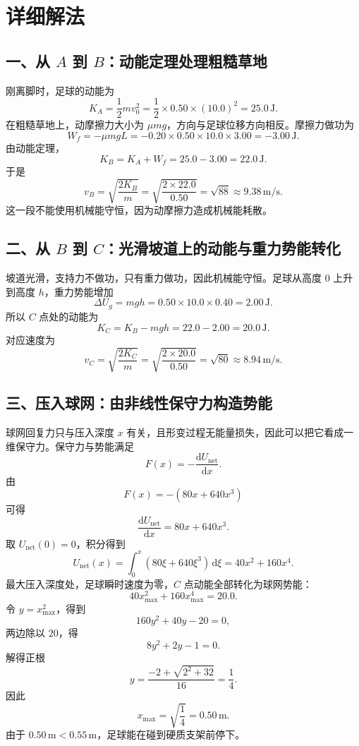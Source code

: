 \documentclass[11pt,a4paper,fontset=fandol]{ctexart}
\newcommand{\dd}{\mathrm{d}}
\begin{document}
\section*{详细解法}

\subsection*{一、从 $A$ 到 $B$：动能定理处理粗糙草地}
刚离脚时，足球的动能为
\[
 K_A=\frac{1}{2}mv_0^2=\frac{1}{2}\times 0.50\times (10.0)^2=25.0\,\mathrm{J}.
\]
在粗糙草地上，动摩擦力大小为 $\mu mg$，方向与足球位移方向相反。摩擦力做功为
\[
 W_f=-\mu mgL=-0.20\times 0.50\times 10.0\times 3.00=-3.00\,\mathrm{J}.
\]
由动能定理，
\[
 K_B=K_A+W_f=25.0-3.00=22.0\,\mathrm{J}.
\]
于是
\[
 v_B=\sqrt{\frac{2K_B}{m}}=\sqrt{\frac{2\times 22.0}{0.50}}
=\sqrt{88}\approx 9.38\,\mathrm{m/s}.
\]
这一段不能使用机械能守恒，因为动摩擦力造成机械能耗散。

\subsection*{二、从 $B$ 到 $C$：光滑坡道上的动能与重力势能转化}
坡道光滑，支持力不做功，只有重力做功，因此机械能守恒。足球从高度 $0$ 上升到高度 $h$，重力势能增加
\[
 \Delta U_g=mgh=0.50\times 10.0\times 0.40=2.00\,\mathrm{J}.
\]
所以 $C$ 点处的动能为
\[
 K_C=K_B-mgh=22.0-2.00=20.0\,\mathrm{J}.
\]
对应速度为
\[
 v_C=\sqrt{\frac{2K_C}{m}}=\sqrt{\frac{2\times 20.0}{0.50}}
=\sqrt{80}\approx 8.94\,\mathrm{m/s}.
\]

\subsection*{三、压入球网：由非线性保守力构造势能}
球网回复力只与压入深度 $x$ 有关，且形变过程无能量损失，因此可以把它看成一维保守力。保守力与势能满足
\[
 F(x)=-\frac{\dd U_{\mathrm{net}}}{\dd x}.
\]
由
\[
 F(x)=-(80x+640x^3)
\]
可得
\[
 \frac{\dd U_{\mathrm{net}}}{\dd x}=80x+640x^3.
\]
取 $U_{\mathrm{net}}(0)=0$，积分得到
\[
 U_{\mathrm{net}}(x)=\int_0^x (80\xi+640\xi^3)\,\dd\xi
=40x^2+160x^4.
\]
最大压入深度处，足球瞬时速度为零，$C$ 点动能全部转化为球网势能：
\[
 40x_{\max}^2+160x_{\max}^4=20.0.
\]
令 $y=x_{\max}^2$，得到
\[
 160y^2+40y-20=0,
\]
两边除以 $20$，得
\[
 8y^2+2y-1=0.
\]
解得正根
\[
 y=\frac{-2+\sqrt{2^2+32}}{16}=\frac{1}{4}.
\]
因此
\[
 x_{\max}=\sqrt{\frac14}=0.50\,\mathrm{m}.
\]
由于 $0.50\,\mathrm{m}<0.55\,\mathrm{m}$，足球能在碰到硬质支架前停下。
\end{document}
